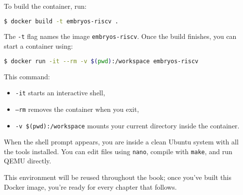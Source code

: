 To build the container, run:

\begin{lstlisting}[style=oscode,language=bash]
$ docker build -t embryos-riscv .
\end{lstlisting}

The \texttt{-t} flag names the image \texttt{embryos-riscv}.  
Once the build finishes, you can start a container using:

\begin{lstlisting}[style=oscode,language=bash]
$ docker run -it --rm -v $(pwd):/workspace embryos-riscv
\end{lstlisting}

This command:
\begin{itemize}
  \item \texttt{-it} starts an interactive shell,
  \item \texttt{--rm} removes the container when you exit,
  \item \texttt{-v \$(pwd):/workspace} mounts your current directory inside the container.
\end{itemize}

When the shell prompt appears, you are inside a clean Ubuntu system with all the
tools installed.  You can edit files using \texttt{nano}, compile with
\texttt{make}, and run QEMU directly.

\bigskip
\noindent
This environment will be reused throughout the book; once you’ve built this
Docker image, you’re ready for every chapter that follows.
